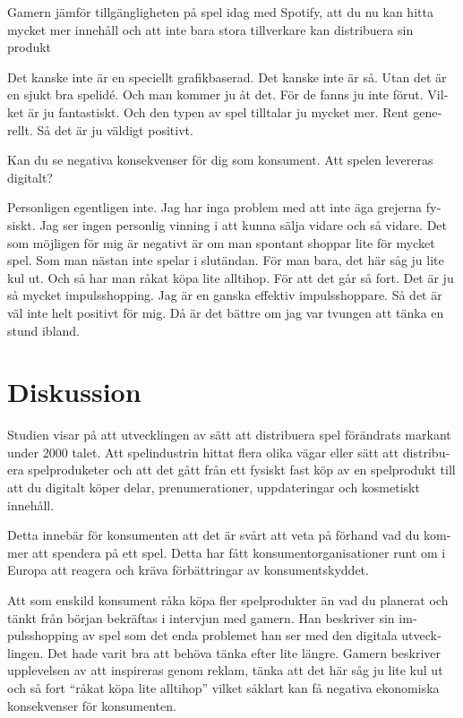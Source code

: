 \documentclass[11p]{article}
\begin{document}
\begin{otherlanguage}{swedish}
        \setlength{\leftskip}{0cm}
        Gamern jämför tillgängligheten på spel idag med Spotify, att du nu kan hitta mycket mer innehåll och att inte bara stora tillverkare kan distribuera sin produkt

        \setlength{\leftskip}{1cm}
        Det kanske inte är en speciellt grafikbaserad. Det kanske inte är så. Utan det är en sjukt bra spelidé. Och man kommer ju åt det. För de fanns ju inte förut. Vilket är ju fantastiskt. Och den typen av spel tilltalar ju mycket mer. Rent generellt. Så det är ju väldigt positivt.


        \setlength{\leftskip}{0cm}
        Kan du se negativa konsekvenser för dig som konsument. Att spelen levereras digitalt?

        \setlength{\leftskip}{1cm}
        Personligen egentligen inte. Jag har inga problem med att inte äga grejerna fysiskt. Jag ser ingen personlig vinning i att kunna sälja vidare och så vidare.
        Det som möjligen för mig är negativt är om man spontant shoppar lite för mycket spel. Som man nästan inte spelar i slutändan. För man bara, det här såg ju lite kul ut. Och så har man råkat köpa lite alltihop. För att det går så fort. Det är ju så mycket impulsshopping. Jag är en ganska effektiv impulsshoppare. Så det är väl inte helt positivt för mig. Då är det bättre om jag var tvungen att tänka en stund ibland.



        \setlength{\leftskip}{0cm}



        \section{Diskussion}

        Studien visar på att utvecklingen av sätt att distribuera spel förändrats markant under 2000 talet.
        Att spelindustrin hittat flera olika vägar eller sätt att distribuera spelproduketer och att det gått från ett fysiskt fast köp av en spelprodukt till att du digitalt köper delar, prenumerationer, uppdateringar och kosmetiskt innehåll.

        Detta innebär för konsumenten att det är svårt att veta på förhand vad du kommer att spendera på ett spel.
        Detta har fått konsumentorganisationer runt om i Europa att reagera och kräva förbättringar av konsumentskyddet.

        Att som enskild konsument råka köpa fler spelprodukter än vad du planerat och tänkt från början bekräftas i intervjun med gamern.
        Han beskriver sin impulsshopping av spel som det enda problemet han ser med den digitala utvecklingen.
        Det hade varit bra att behöva tänka efter lite längre.
        Gamern beskriver upplevelsen av att inspireras genom reklam, tänka att det här såg ju lite kul ut och så fort “råkat köpa lite alltihop” vilket såklart kan få negativa ekonomiska konsekvenser för konsumenten.


\end{otherlanguage}
\end{document}
